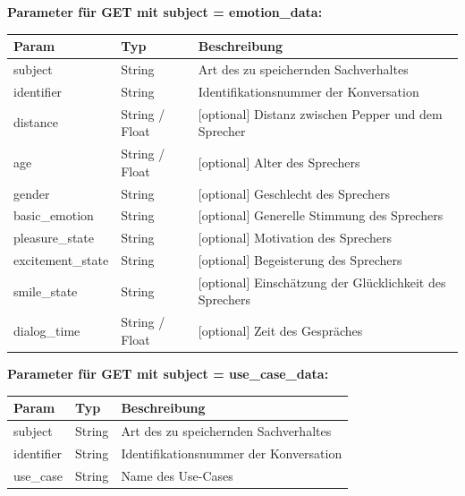 \textbf{Parameter für GET mit subject = emotion\_data:}
\begin{table}[H]
    \label{table:/docker-hbv-kms-http/collector2}
    \setlength{\tabcolsep}{3pt}
    \begin{tabular}{p{100pt}p{80pt}p{200pt}}
        \hline
        Param             & Typ            & Beschreibung                                            \\
        \hline
        subject           & String         & Art des zu speichernden Sachverhaltes                   \\
        identifier        & String         & Identifikationsnummer der Konversation                  \\
        distance          & String / Float & [optional] Distanz zwischen Pepper und dem Sprecher     \\
        age               & String / Float & [optional] Alter des Sprechers                          \\
        gender            & String         & [optional] Geschlecht des Sprechers                     \\
        basic\_emotion    & String         & [optional] Generelle Stimmung des Sprechers             \\
        pleasure\_state   & String         & [optional] Motivation des Sprechers                     \\
        excitement\_state & String         & [optional] Begeisterung des Sprechers                   \\
        smile\_state      & String         & [optional] Einschätzung der Glücklichkeit des Sprechers \\
        dialog\_time      & String / Float & [optional] Zeit des Gespräches                          \\
        \hline
    \end{tabular}
\end{table}


\textbf{Parameter für GET mit subject = use\_case\_data:}
\begin{table}[H]
    \label{table:/docker-hbv-kms-http/collector3}
    \setlength{\tabcolsep}{3pt}
    \begin{tabular}{p{100pt}p{80pt}p{200pt}}
        \hline
        Param      & Typ    & Beschreibung                           \\
        \hline
        subject    & String & Art des zu speichernden Sachverhaltes  \\
        identifier & String & Identifikationsnummer der Konversation \\
        use\_case  & String & Name des Use-Cases                     \\
        \hline
    \end{tabular}
\end{table}

